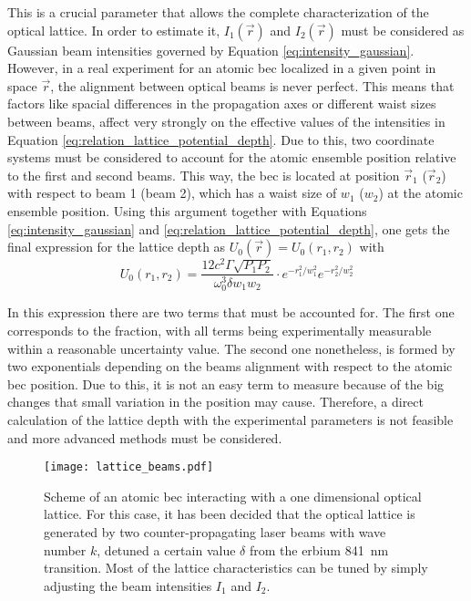 This is a crucial parameter that allows the complete characterization of the optical lattice. In order to estimate it, $I_{1}(\vec{r})$ and $I_{2}(\vec{r})$ must be considered as Gaussian beam intensities governed by Equation \eqref{eq:intensity_gaussian}. However, in a real experiment for an atomic \ac{bec} localized in a given point in space $\vec{r}$, the alignment between optical beams is never perfect. This means that factors like spacial differences in the propagation axes or different waist sizes between beams, affect very strongly on the effective values of the intensities in Equation \eqref{eq:relation_lattice_potential_depth}. Due to this, two coordinate systems must be considered to account for the atomic ensemble position relative to the first and second beams. This way, the \ac{bec} is located at position $\vec{r}_1$ ($\vec{r}_2$) with respect to beam 1 (beam 2), which has a waist size of $w_1$ ($w_2$) at the atomic ensemble position. Using this argument together with Equations \eqref{eq:intensity_gaussian} and \eqref{eq:relation_lattice_potential_depth}, one gets the final expression for the lattice depth as $U_{0}(\vec{r})=U_{0}(r_1,r_2)$ with
\begin{equation}\label{eq:relation_lattice_potential_depth_final}
	U_{0}(r_1,r_2) = \frac{12 c^2 \Gamma\sqrt{P_1 P_2}}{\omega_0^3 \delta w_1 w_2} \cdot e^{-r_1^2/w_1^2} e^{-r_2^2/w_2^2}
\end{equation} 

In this expression there are two terms that must be accounted for. The first one corresponds to the fraction, with all terms being experimentally measurable within a reasonable uncertainty value. The second one nonetheless, is formed by two exponentials depending on the beams alignment with respect to the atomic \ac{bec} position. Due to this, it is not an easy term to measure because of the big changes that small variation in the position may cause. Therefore, a direct calculation of the lattice depth with the experimental parameters is not feasible and more advanced methods must be considered.

\begin{figure}[!htbp]\centering
	\texttt{[image: lattice\_beams.pdf]}
	\caption[Scheme of an atomic \ac{bec} interacting with a one dimensional optical lattice]{Scheme of an atomic \ac{bec} interacting with a one dimensional optical lattice. For this case, it has been decided that the optical lattice is generated by two counter-propagating laser beams with wave number $k$, detuned a certain value $\delta$ from the erbium \SI{841}{\nano\meter} transition. Most of the lattice characteristics can be tuned by simply adjusting the beam intensities $I_1$ and $I_2$.}\label{fig:lattice_beams}
\end{figure}

